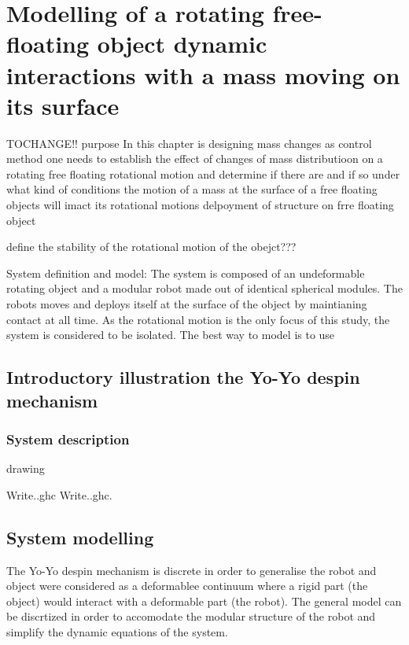 

\chapter{Modelling of a rotating free-floating object dynamic interactions with a mass moving on its surface}
\label{ch:Stability study}
TOCHANGE!! purpose In this chapter is designing mass changes as control method one needs to establish the effect of changes of mass distributioon on a rotating free floating rotational motion and determine if there are and if so under what kind of conditions the motion of a mass at the surface of a free floating objects will imact its rotational motions
delpoyment of structure on frre floating object

define the stability of the rotational motion of the obejct???

System definition and model: The system is composed of an undeformable rotating object and a modular robot made out of identical spherical modules. The robots moves and deploys itself at the surface of the object by maintianing contact at all time. As the rotational motion is the only focus of this study, the system is considered to be isolated.
The best way to model is to use 

\section{Introductory illustration the Yo-Yo despin mechanism}
\label{Introductory illustration the Yo-Yo despin mechanism}

\subsection{System description}
drawing



Write..\gls{ghc}
Write..\gls{ghc}.





\section{System modelling}
\label{System modelling}
The Yo-Yo despin mechanism is discrete in order to generalise the robot and object were considered as a deformablee continuum where a rigid part (the object) would interact with a deformable part (the robot). The general model can be discrtized in order to accomodate the modular structure of the robot and simplify the dynamic equations of the system.


